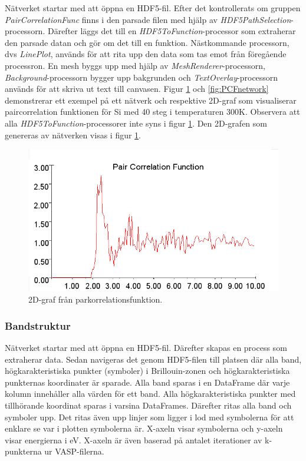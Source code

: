 \documentclass[10pt,oneside,swedish]{article}
\begin{document}
Nätverket startar med att öppna en HDF5-fil. Efter det kontrollerats om
gruppen \emph{PairCorrelationFunc} finns i den parsade filen med hjälp
av \emph{HDF5PathSelection}-processorn. Därefter läggs det till en
\emph{HDF5ToFunction}-processor som extraherar den parsade datan och gör
om det till en funktion. Nästkommande processorn, dvs \emph{LinePlot},
används för att rita upp den data som tas emot från föregående
processron. En mesh byggs upp med hjälp av
\emph{MeshRenderer}-processorn, \emph{Background}-processorn bygger upp
bakgrunden och \emph{TextOverlay}-processorn används för att skriva ut
text till canvasen. Figur \ref{fig:PCF} och \ref{fig:PCFnetwork} demonstrerar ett
exempel på ett nätverk och respektive 2D-graf som visualiserar
paircorrelation funktionen för Si med 40 steg i temperaturen 300K.
Observera att alla \emph{HDF5ToFunction}-processorer inte syns i figur
\ref{fig:PCF}. Den 2D-grafen som genereras av nätverken visas i figur
\ref{fig:PCF}.

\begin{figure}[H]
\centering
\includegraphics[width=1.00000\textwidth]{Images/network.png}
\caption{2D-graf från parkorrelationsfunktion.}
\label{fig:PCF}
\end{figure}

\subsubsection{Bandstruktur}\label{bandstruktur}

Nätverket startar med att öppna en HDF5-fil. Därefter skapas en process
som extraherar data. Sedan navigeras det genom HDF5-filen till platsen
där alla band, högkarakteristiska punkter (symboler) i Brillouin-zonen
och högkarakteristiska punkternas koordinater är sparade. Alla band
sparas i en DataFrame där varje kolumn innehåller alla värden för ett
band. Alla högkarakteristiska punkter med tillhörande koordinat sparas i
varsina DataFrames. Därefter ritas alla band och symboler upp. Det ritas
även upp linjer som ligger i lod med symbolerna för att enklare se var i
plotten symbolerna är. X-axeln visar symbolerna och y-axeln visar
energierna i eV. X-axeln är även baserad på antalet iterationer av
k-punkterna ur VASP-filerna.
\end{document}
